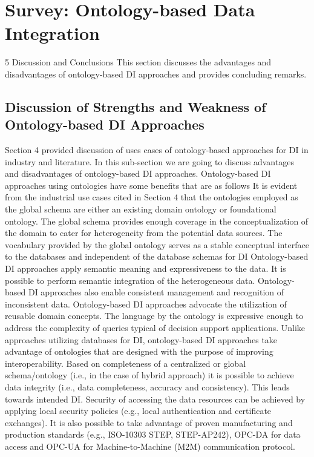 \section{Survey: Ontology-based Data Integration}
\label{sec:Survey}
\vspace{-.3cm}
5 Discussion and Conclusions
This section discusses the advantages and disadvantages of ontology-based DI approaches and provides concluding remarks.
\subsection{Discussion of Strengths and Weakness of Ontology-based DI
Approaches} Section 4 provided discussion of uses cases of ontology-based approaches for DI in industry and literature. In this sub-section we are going to discuss advantages and disadvantages of ontology-based DI approaches. Ontology-based DI approaches using ontologies have some benefits that are as follows
It is evident from the industrial use cases cited in Section 4 that the ontologies employed as the global schema are either an existing domain ontology or foundational ontology. The global schema provides enough coverage in the conceptualization of the domain to cater for heterogeneity from the potential data sources. The vocabulary provided by the global ontology serves as a stable conceptual interface to the databases and independent of the database schemas for DI
Ontology-based DI approaches apply semantic meaning and expressiveness to the data. It is possible to perform semantic integration of the heterogeneous data. Ontology-based DI approaches also enable consistent management and recognition of inconsistent data.
Ontology-based DI approaches advocate the utilization of reusable domain concepts. The language by the ontology is expressive enough to address the complexity of queries typical of decision support applications.
Unlike approaches utilizing databases for DI, ontology-based DI approaches take advantage of ontologies that are designed with the purpose of improving interoperability. Based on completeness of a centralized or global schema/ontology (i.e., in the case of hybrid approach) it is possible to achieve data integrity (i.e., data completeness, accuracy and consistency). This leads towards intended DI. Security of accessing the data resources can be achieved by applying local security policies (e.g., local authentication and certificate exchanges).
It is also possible to take advantage of proven manufacturing and production standards (e.g., ISO-10303 STEP, STEP-AP242), OPC-DA for data access and OPC-UA for Machine-to-Machine (M2M) communication protocol.
